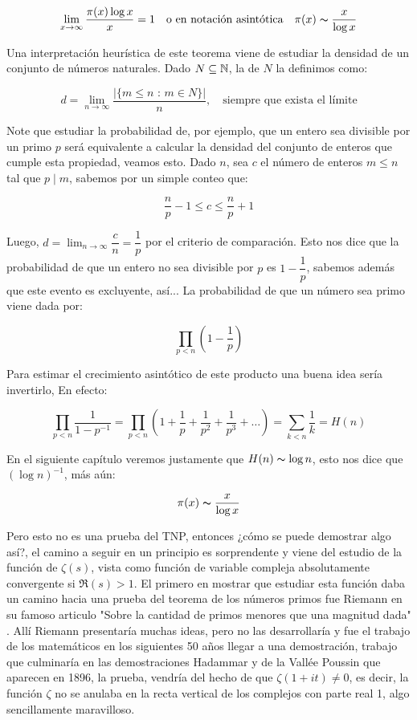 $$\lim_{x \to \infty}\dfrac{\pi(x)\log x}{x}=1 \quad \text{o en notación asintótica} \quad \pi(x)\thicksim \dfrac{x}{\log x}$$

Una interpretación heurística de este teorema viene de estudiar la densidad de un conjunto de números naturales. Dado $N\subseteq \mathbb{N}$, la  de $N$ la definimos como:

$$d=\lim_{n\to \infty}\frac{|\{m\leq n \text{ : }m\in N\}|}{n}, \quad \text{siempre que exista el límite}$$

Note que estudiar la probabilidad de, por ejemplo, que un entero sea divisible por un primo $p$ será equivalente a calcular la densidad del conjunto de enteros que cumple esta propiedad, veamos esto. Dado $n$, sea  $c$ el número de enteros $m\leq n$ tal que $p\mid m$, sabemos por un simple conteo que:

$$\frac{n}{p}-1\leq c\leq\frac{n}{p}+1$$

Luego, $d=\displaystyle\lim_{n \to \infty}\dfrac{c}{n}=\dfrac{1}{p}$ por el criterio de comparación. Esto nos dice que la probabilidad de que un entero no sea divisible por $p$ es $1-\dfrac{1}{p}$, sabemos además que este evento es excluyente, así... La probabilidad de que un número sea primo viene dada por:

$$\displaystyle\prod_{p<n}\left( 1-\frac{1}{p} \right)$$

Para estimar el crecimiento asintótico de este producto una buena idea sería invertirlo, En efecto:

$$\prod_{p<n} \dfrac{1}{1-p^{-1}}=\prod_{p<n} \left(1+\dfrac{1}{p}+\dfrac{1}{p^2}+\dfrac{1}{p^3}+\ldots\right)=\sum_{k<n}\frac{1}{k}=H(n)$$

En el siguiente capítulo veremos justamente que $H(n)\thicksim \log n$, esto nos dice que  $(\log n)^{-1}$, más aún:

$$\pi(x)\thicksim \dfrac{x}{\log x}$$

Pero esto no es una prueba del TNP, entonces ¿cómo se puede demostrar algo así?, el camino a seguir en un principio es sorprendente y viene del estudio de la función de $\zeta(s)$, vista como función de variable compleja absolutamente convergente si $\Re(s)>1$. El primero en mostrar que estudiar esta función daba un camino hacia una prueba del teorema de los números primos fue Riemann en su famoso articulo "Sobre la cantidad de primos menores que una magnitud dada" \cite{riemann1990ueber}. Allí Riemann presentaría muchas ideas, pero no las desarrollaría y fue el trabajo de los matemáticos en los siguientes 50 años llegar a una demostración, trabajo que culminaría en las demostraciones Hadammar y de la Vallée Poussin que aparecen en 1896, la prueba, vendría del hecho de que $\zeta(1+it)\neq 0$, es decir, la función $\zeta$ no se anulaba en la recta vertical de los complejos con parte real 1, algo sencillamente maravilloso.\\

